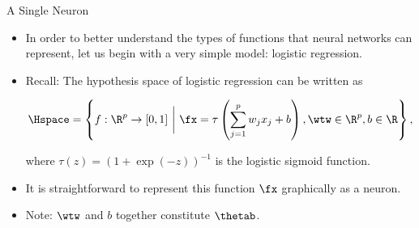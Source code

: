 % 


\begin{frame} {A Single Neuron}
  \begin{itemize}
    \vspace{5mm}
    \item In order to better understand the types of functions that neural networks can represent, let us begin with a very simple model: logistic regression.
    \item Recall: The hypothesis space of logistic regression can be written as 
    \begin{small}
    $$
    \Hspace = \left\{f: \R^p \to [0, 1] ~\bigg|~ \fx = \tau\left(\sum_{j = 1}^p w_j x_j + b\right), \wtw \in \R^p, b \in \R \right\},
    $$
    \end{small}
    where $\tau(z) = (1 + \exp(-z))^{-1}$ is the logistic sigmoid function.
    \item It is straightforward to represent this function $\fx$ graphically as a neuron.
    \item Note: $\wtw$ and $b$ together constitute $\thetab$.
  \end{itemize}
\end{frame}

